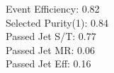 Event Efficiency:   0.82\\ 
Selected Purity(1): 0.84\\ 
Passed Jet S/T:     0.77\\ 
Passed Jet MR:      0.06\\ 
Passed Jet Eff:     0.16